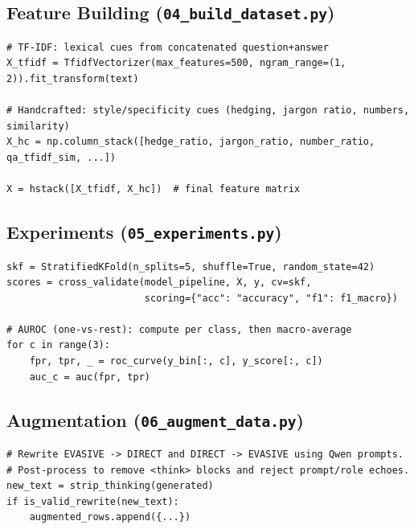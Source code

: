 \documentclass[12pt]{article}
\begin{document}
\subsection*{Feature Building (\texttt{04\_build\_dataset.py})}
\begin{lstlisting}[caption={Two families: TF-IDF (500) + handcrafted (21).}]
# TF-IDF: lexical cues from concatenated question+answer
X_tfidf = TfidfVectorizer(max_features=500, ngram_range=(1, 2)).fit_transform(text)

# Handcrafted: style/specificity cues (hedging, jargon ratio, numbers, similarity)
X_hc = np.column_stack([hedge_ratio, jargon_ratio, number_ratio, qa_tfidf_sim, ...])

X = hstack([X_tfidf, X_hc])  # final feature matrix
\end{lstlisting}

\subsection*{Experiments (\texttt{05\_experiments.py})}
\begin{lstlisting}[caption={Stratified 5-fold CV + metrics + one-vs-rest AUROC.}]
skf = StratifiedKFold(n_splits=5, shuffle=True, random_state=42)
scores = cross_validate(model_pipeline, X, y, cv=skf,
                        scoring={"acc": "accuracy", "f1": f1_macro})

# AUROC (one-vs-rest): compute per class, then macro-average
for c in range(3):
    fpr, tpr, _ = roc_curve(y_bin[:, c], y_score[:, c])
    auc_c = auc(fpr, tpr)
\end{lstlisting}

\subsection*{Augmentation (\texttt{06\_augment\_data.py})}
\begin{lstlisting}[caption={Style rewriting + artifact filtering for clean synthetic data.}]
# Rewrite EVASIVE -> DIRECT and DIRECT -> EVASIVE using Qwen prompts.
# Post-process to remove <think> blocks and reject prompt/role echoes.
new_text = strip_thinking(generated)
if is_valid_rewrite(new_text):
    augmented_rows.append({...})
\end{lstlisting}
\end{document}
